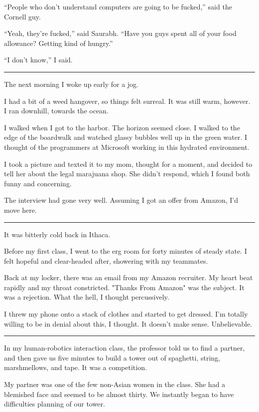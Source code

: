 ``People who don't understand computers are going to be fucked,''
said the Cornell guy.

``Yeah, they're fucked,'' said Saurabh.  ``Have you guys spent all of your food
allowance?  Getting kind of hungry.''

``I don't know,'' I said.

\plainfancybreak{12pt}{2}{* * *}

The next morning I woke up early for a jog.

I had a bit of a weed hangover, so things felt surreal.  It was still warm,
however.  I ran downhill, towards the ocean.

I walked when I got to the harbor.  The horizon seemed close.  I walked to the
edge of the boardwalk and watched glassy bubbles well up in the green water.  I
thought of the programmers at Microsoft working in this hydrated environment. 

I took a picture and texted it to my mom, thought for a moment, and decided to
tell her about the legal marajuana shop.  She didn't respond, which I found both
funny and concerning. 

The interview had gone very well.  Assuming I got an offer from Amazon, I'd move
here. 

\plainfancybreak{12pt}{2}{* * *}

It was bitterly cold back in Ithaca.

Before my first class, I went to the erg room for forty minutes of steady state.
I felt hopeful and clear-headed after, showering with my teammates.

Back at my locker, there was an email from my Amazon recruiter.  My heart beat
rapidly and my throat constricted.  "Thanks From Amazon" was the subject.  It
was a rejection.  What the hell, I thought percussively. 

I threw my phone onto a stack of clothes and started to get dressed.  I'm
totally willing to be in denial about this, I thought.  It doesn't make sense.
Unbelievable. 

\plainfancybreak{12pt}{2}{* * *}

In my human-robotics interaction class, the professor told us to find a partner,
and then gave us five minutes to build a tower out of spaghetti, string,
marshmellows, and tape.  It was a competition.

My partner was one of the few non-Asian women in the class.  She had a blemished
face and seemed to be almost thirty.  We instantly began to have difficulties
planning of our tower.  


